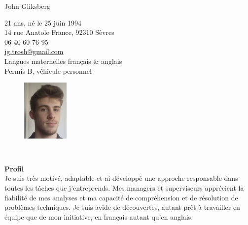 \documentclass[pdftex,a4paper,10pt]{article}
\begin{document}

{\Large John \sc Gliksberg}
\hrulefill\\[-.47cm]
\begin{minipage}{0.8\textwidth}
\begin{flushleft}
\vspace{.5cm}
21 ans, né le 25 juin 1994\\
14 rue Anatole France, 92310 Sèvres\\[.2cm]
06 40 60 76 95\\
\href{mailto:jg.trosh@gmail.com}
{jg.trosh@gmail.com}\\[.2cm]
Langues maternelles français \& anglais\\
Permis B, véhicule personnel
\end{flushleft}
\end{minipage}%
\begin{minipage}{0.2\textwidth}
\begin{figure}[H]
\begin{flushright}
\includegraphics[height=3cm]{johnpic}
\end{flushright}
\end{figure}
\end{minipage}\\

\begin{center}
\end{center}
\vspace{.3cm}

{\large\bf Profil}
\hrulefill\\[.3cm]
{\setlength{\extrarowheight}{.2cm}
Je suis très motivé, adaptable et ai développé une approche responsable
dans toutes les tâches que j'entreprends.
Mes managers et superviseurs apprécient la fiabilité de mes analyses
et ma capacité de compréhension et de résolution de problèmes techniques.
Je suis avide de découvertes, autant prêt à travailler en équipe que
de mon initiative, en français autant qu'en anglais.
}
\vspace{.3cm}
\end{document}
